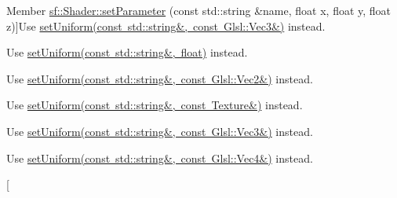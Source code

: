 \begin{DoxyRefList}
Member \mbox{\hyperlink{classsf_1_1_shader_a1fa0fb11cabd8553ccd37e97c725c992}{sf\+:\+:Shader\+:\+:set\+Parameter}} (const std\+::string \&name, float x, float y, float z)]Use \mbox{\hyperlink{classsf_1_1_shader_aad654ad8de6f0c56191fa7b8cea21db2}{set\+Uniform(const std\+::string\&, const Glsl\+::\+Vec3\&)}} instead.  
\item[\label{deprecated__deprecated000006}%
\Hypertarget{deprecated__deprecated000006}%
Member \mbox{\hyperlink{classsf_1_1_shader_a4d6ec78f6de1a0a2146c93ab09d7d762}{sf\+:\+:Shader\+:\+:set\+Parameter}} (const std\+::string \&name, float x)]Use \mbox{\hyperlink{classsf_1_1_shader_abf78e3bea1e9b0bab850b6b0a0de29c7}{set\+Uniform(const std\+::string\&, float)}} instead.  
\item[\label{deprecated__deprecated000007}%
\Hypertarget{deprecated__deprecated000007}%
Member \mbox{\hyperlink{classsf_1_1_shader_a61f5cdb5847fc3b57335b095a2f3dad3}{sf\+:\+:Shader\+:\+:set\+Parameter}} (const std\+::string \&name, float x, float y)]Use \mbox{\hyperlink{classsf_1_1_shader_a4a2c673c41e37b17d67e4af1298b679f}{set\+Uniform(const std\+::string\&, const Glsl\+::\+Vec2\&)}} instead.  
\item[\label{deprecated__deprecated000014}%
\Hypertarget{deprecated__deprecated000014}%
Member \mbox{\hyperlink{classsf_1_1_shader_a08c7cafd4f73ab898319c4fd7d8b5501}{sf\+:\+:Shader\+:\+:set\+Parameter}} (const std\+::string \&name, const \mbox{\hyperlink{classsf_1_1_texture}{Texture}} \&texture)]Use \mbox{\hyperlink{classsf_1_1_shader_a7806a29ffbd0ee9251256a9e7265d479}{set\+Uniform(const std\+::string\&, const Texture\&)}} instead.  
\item[\label{deprecated__deprecated000011}%
\Hypertarget{deprecated__deprecated000011}%
Member \mbox{\hyperlink{classsf_1_1_shader_abf1eb5e74f216c7bcfaf34d08c960ee0}{sf\+:\+:Shader\+:\+:set\+Parameter}} (const std\+::string \&name, const Vector3f \&vector)]Use \mbox{\hyperlink{classsf_1_1_shader_aad654ad8de6f0c56191fa7b8cea21db2}{set\+Uniform(const std\+::string\&, const Glsl\+::\+Vec3\&)}} instead.  
\item[\label{deprecated__deprecated000009}%
\Hypertarget{deprecated__deprecated000009}%
Member \mbox{\hyperlink{classsf_1_1_shader_a6d6b84575a5f1a869d70a126df8d6478}{sf\+:\+:Shader\+:\+:set\+Parameter}} (const std\+::string \&name, float x, float y, float z, float w)]Use \mbox{\hyperlink{classsf_1_1_shader_abc1aee8343800680fd62e1f3d43c24bf}{set\+Uniform(const std\+::string\&, const Glsl\+::\+Vec4\&)}} instead.  
\item[\label{deprecated__deprecated000017}%

\end{DoxyRefList}
